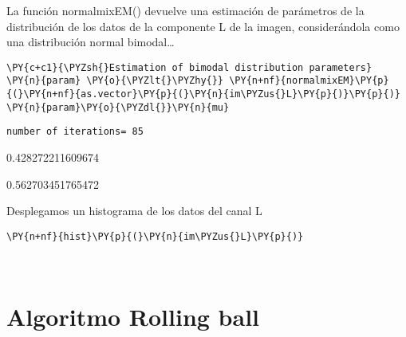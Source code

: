     La función normalmixEM() devuelve una estimación de parámetros de la
distribución de los datos de la componente L de la imagen,
considerándola como una distribución normal bimodal\ldots{}

    \begin{tcolorbox}[breakable, size=fbox, boxrule=1pt, pad at break*=1mm,colback=cellbackground, colframe=cellborder]
\begin{Verbatim}[commandchars=\\\{\}]
\PY{c+c1}{\PYZsh{}Estimation of bimodal distribution parameters}
\PY{n}{param} \PY{o}{\PYZlt{}\PYZhy{}} \PY{n+nf}{normalmixEM}\PY{p}{(}\PY{n+nf}{as.vector}\PY{p}{(}\PY{n}{im\PYZus{}L}\PY{p}{)}\PY{p}{)}
\PY{n}{param}\PY{o}{\PYZdl{}}\PY{n}{mu}
\end{Verbatim}
\end{tcolorbox}

    \begin{Verbatim}[commandchars=\\\{\}]
number of iterations= 85
    \end{Verbatim}

    \begin{enumerate*}
\item 0.428272211609674
\item 0.562703451765472
\end{enumerate*}


    
    Desplegamos un histograma de los datos del canal L

    \begin{tcolorbox}[breakable, size=fbox, boxrule=1pt, pad at break*=1mm,colback=cellbackground, colframe=cellborder]
\begin{Verbatim}[commandchars=\\\{\}]
\PY{n+nf}{hist}\PY{p}{(}\PY{n}{im\PYZus{}L}\PY{p}{)}
\end{Verbatim}
\end{tcolorbox}

    \begin{center}
    \end{center}
    { \hspace*{\fill} \\}
    
    \hypertarget{algoritmo-rolling-ball}{%
\section{Algoritmo Rolling ball}\label{algoritmo-rolling-ball}}

